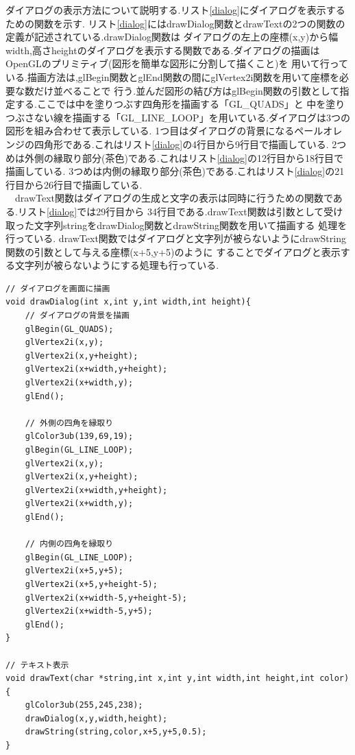 \documentclass[a4j]{jarticle}
\begin{document}
        ダイアログの表示方法について説明する.リスト\ref{dialog}にダイアログを表示するための関数を示す.
        リスト\ref{dialog}にはdrawDialog関数とdrawTextの2つの関数の定義が記述されている.drawDialog関数は
        ダイアログの左上の座標(x,y)から幅width,高さheightのダイアログを表示する関数である.ダイアログの描画はOpenGLのプリミティブ(図形を簡単な図形に分割して描くこと)を
        用いて行っている.描画方法は,glBegin関数とglEnd関数の間にglVertex2i関数を用いて座標を必要な数だけ並べることで
        行う.並んだ図形の結び方はglBegin関数の引数として指定する.ここでは中を塗りつぶす四角形を描画する「GL\_QUADS」と
        中を塗りつぶさない線を描画する「GL\_LINE\_LOOP」を用いている.ダイアログは3つの図形を組み合わせて表示している.
        1つ目はダイアログの背景になるペールオレンジの四角形である.これはリスト\ref{dialog}の4行目から9行目で描画している.
        2つめは外側の縁取り部分(茶色)である.これはリスト\ref{dialog}の12行目から18行目で描画している.
        3つめは内側の縁取り部分(茶色)である.これはリスト\ref{dialog}の21行目から26行目で描画している.\\
        　drawText関数はダイアログの生成と文字の表示は同時に行うための関数である.リスト\ref{dialog}では29行目から
        34行目である.drawText関数は引数として受け取った文字列stringをdrawDialog関数とdrawString関数を用いて描画する
        処理を行っている. drawText関数ではダイアログと文字列が被らないようにdrawString関数の引数として与える座標(x+5,y+5)のように
        することでダイアログと表示する文字列が被らないようにする処理も行っている.
        \begin{lstlisting}[basicstyle=\ttfamily\footnotesize, frame=single,label=dialog,caption=ダイアログ表示の実装]
// ダイアログを画面に描画
void drawDialog(int x,int y,int width,int height){
    // ダイアログの背景を描画
    glBegin(GL_QUADS);
    glVertex2i(x,y);
    glVertex2i(x,y+height);
    glVertex2i(x+width,y+height);
    glVertex2i(x+width,y);
    glEnd();

    // 外側の四角を縁取り
    glColor3ub(139,69,19);
    glBegin(GL_LINE_LOOP);
    glVertex2i(x,y);
    glVertex2i(x,y+height);
    glVertex2i(x+width,y+height);
    glVertex2i(x+width,y);
    glEnd();

    // 内側の四角を縁取り
    glBegin(GL_LINE_LOOP);
    glVertex2i(x+5,y+5);
    glVertex2i(x+5,y+height-5);
    glVertex2i(x+width-5,y+height-5);
    glVertex2i(x+width-5,y+5);
    glEnd();
}

// テキスト表示
void drawText(char *string,int x,int y,int width,int height,int color){
    glColor3ub(255,245,238);
    drawDialog(x,y,width,height);
    drawString(string,color,x+5,y+5,0.5);
}
        \end{lstlisting} 
\end{document}
